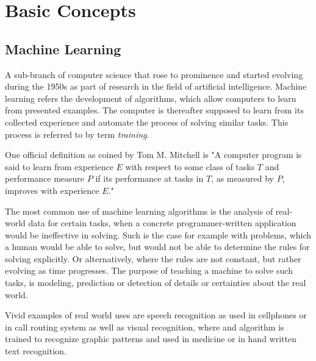 \section{Basic Concepts}
	\subsection{Machine Learning}
		A sub-branch of computer science that rose to prominence and started evolving during the 1950s as part of research in the field of artificial intelligence. Machine learning refers the development of algorithms, which allow computers to learn from presented examples. The computer is thereafter supposed to learn from its collected experience and automate the process of solving similar tasks. This process is referred to by term \textit{training}.
		\par
		One official definition as coined by Tom M. Mitchell \cite{mitchell} is  "A computer program is said to learn from experience $E$ with respect to some class of tasks $ T $ and performance measure $ P $ if its performance at tasks in $ T $, as measured by $ P $, improves with experience $ E $."
		\par
		The most common use of machine learning algorithms is the analysis of real-world data for certain tasks, when a concrete programmer-written application would be ineffective in solving. Such is the case for example with problems, which a human would be able to solve, but would not be able to determine the rules for solving explicitly. Or alternatively, where the rules are not constant, but rather evolving as time progresses. The purpose of teaching a machine to solve such tasks, is modeling, prediction or detection of details or certainties about the real world. 
		\par
		Vivid examples of real world uses are speech recognition as used in cellphones or in 
		call routing system as well as visual recognition, where and algorithm is trained to recognize graphic patterns and used in medicine or in hand written text recognition.
		
